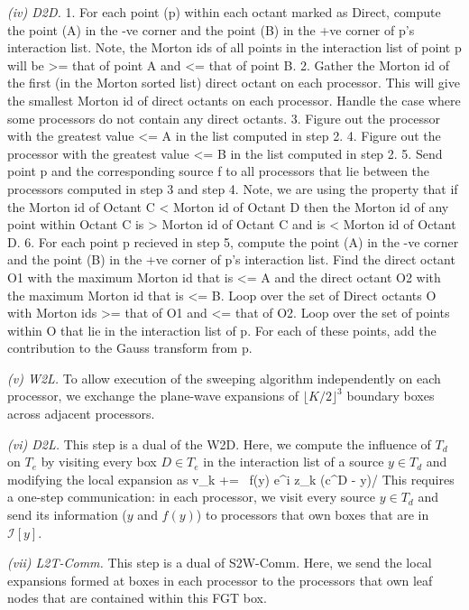 {\em (iv) D2D.}
1. For each point (p) within each octant marked as Direct, compute the
point (A) in the -ve corner and the point (B) in the +ve corner of p's
interaction list. Note, the Morton ids of all points in the interaction
list of point p will be >= that of point A and <= that of point B.
2. Gather the Morton id of the first (in the Morton sorted list) direct
octant on each processor. This will give the smallest Morton id of
direct octants on each processor. Handle the case where some processors
do not contain any direct octants.
3. Figure out the processor with the greatest value <= A in the list
computed in step 2.
4. Figure out the processor with the greatest value <= B in the list
computed in step 2.
5. Send point p and the corresponding source f to all processors that
lie between the processors computed in step 3 and step 4. Note, we are 
using the property that if the Morton id of Octant C < Morton id of 
Octant D then the Morton id of any point within Octant C is >  Morton
id of Octant C and is < Morton id of Octant D.
6. For each point p recieved in step 5, compute the
point (A) in the -ve corner and the point (B) in the +ve corner of p's
interaction list. Find the direct octant O1 with the maximum Morton id that
is <= A and the direct octant O2 with the maximum Morton id that is <=
B. Loop over the set of Direct octants O with Morton ids >= that of O1
and <= that of O2. Loop over the set of points within O that lie in the
interaction list of p. For each of these points, add the contribution to
the Gauss transform from p.

{\em (v) W2L.} To allow execution of the sweeping algorithm independently on each processor, we exchange the plane-wave expansions of $\lfloor K/2 \rfloor ^3$ boundary boxes across adjacent processors. 


{\em (vi) D2L.} This step is a dual of the W2D. Here, we compute the influence of $T_d$ on $T_e$ by visiting every box $D \in T_e$ in the interaction list of a source $y \in T_d$ and modifying the local expansion as 
%
\beq v_k += \, f(y) e^{i z_k \cdot (c^D - y)/\sqrt{\delta}} \eeq
%
This requires a one-step communication: in each processor, we visit every source $y \in T_d$ 
and send its information ($y$ and $f(y)$) to processors that own boxes that are in $\mathcal{I}[y]$.

{\em (vii) L2T-Comm.} This step is a dual of S2W-Comm. Here, we send the local expansions formed at boxes in each processor 
to the processors that own leaf nodes that are contained within this FGT box. 



